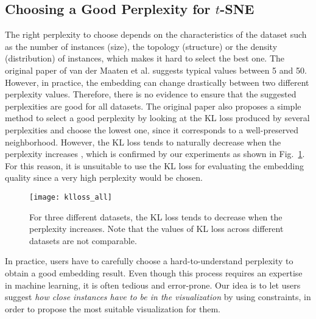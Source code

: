 \subsection{Choosing a Good Perplexity for $t$-SNE}
\label{subsec:perplexity}

The right perplexity to choose depends on the characteristics of the dataset such as the number of instances (size), the topology (structure) or the density (distribution) of instances, which makes it hard to select the best one.
The original paper of van der Maaten et al. \cite{maaten2008tsne} suggests typical values between 5 and 50.
However, in practice, the embedding can change drastically between two different perplexity values. Therefore, there is no evidence to ensure that the suggested perplexities are good for all datasets.
The original paper also proposes a simple method to select a good perplexity by looking at the KL loss produced by several perplexities and choose the lowest one, since it corresponds to a well-preserved neighborhood.
However, the KL loss tends to naturally decrease when the perplexity increases \cite{cao2017automatic}, which  is confirmed by our experiments as shown in Fig.~\ref{fig:klloss}. For this reason, it is unsuitable to use the KL loss for evaluating the embedding quality since a very high perplexity would be chosen.

\begin{figure}
    \centering
    \texttt{[image: klloss\_all]}
    \caption{For three different datasets, the KL loss tends to decrease when the perplexity increases. Note that the values of KL loss across different datasets are not comparable.}
    \label{fig:klloss}
\end{figure}

In practice, users have to carefully choose a hard-to-understand perplexity to obtain a good embedding result.
Even though this process requires an expertise in machine learning, it is often tedious and error-prone.
Our idea is to let users suggest \emph{how close instances have to be in the visualization} by using constraints, in order to propose the most suitable visualization for them.

